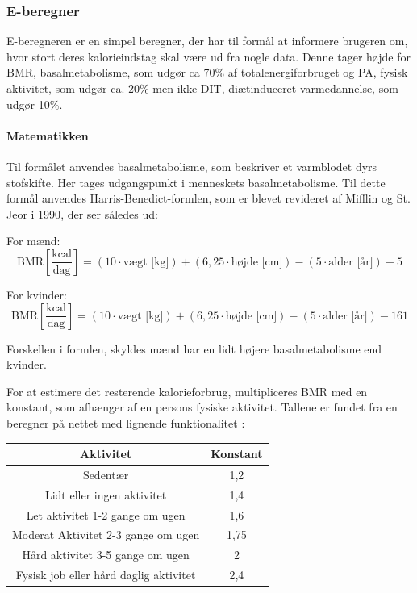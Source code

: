 \subsubsection{E-beregner}
E-beregneren er en simpel beregner, der har til formål at informere brugeren om, hvor stort deres kalorieindstag skal være ud fra nogle data. Denne tager højde for BMR, basalmetabolisme, som udgør ca 70\% af totalenergiforbruget og PA, fysisk aktivitet, som udgør ca. 20\% men ikke DIT, diætinduceret varmedannelse, som udgør 10\%\cite{EE-artikel}.

\paragraph{Matematikken}
Til formålet anvendes basalmetabolisme, som beskriver et varmblodet dyrs stofskifte.\cite{BMR-artikel} Her tages udgangspunkt i menneskets basalmetabolisme. Til dette formål anvendes Harris-Benedict-formlen, som er blevet revideret af Mifflin og St. Jeor i 1990\cite{Harris-Benedict-formel}, der ser således ud:

For mænd:
\begin{equation*}
    \text{BMR} \left[\dfrac{\text{kcal}}{\text{dag}}\right] = (10 \cdot \text{vægt [kg]}) + (6,25 \cdot \text{højde [cm]}) - (5 \cdot \text{alder [år]}) + 5
\end{equation*}

For kvinder:
\begin{equation*}
    \text{BMR} \left[\dfrac{\text{kcal}}{\text{dag}}\right] = (10 \cdot \text{vægt [kg]}) + (6,25 \cdot \text{højde [cm]}) - (5 \cdot \text{alder [år]}) - 161
\end{equation*}

Forskellen i formlen, skyldes mænd har en lidt højere basalmetabolisme end kvinder.

For at estimere det resterende kalorieforbrug, multipliceres BMR med en konstant, som afhænger af en persons fysiske aktivitet. Tallene er fundet fra en beregner på nettet med lignende funktionalitet \cite{OMNI-calc}:
\begin{table}[H]
    \centering
    \begin{tabular}{|c|c|}
        \hline
        \textbf{Aktivitet} & \textbf{Konstant} \\
        \hline
        Sedentær & 1,2 \\
        Lidt eller ingen aktivitet & 1,4 \\
        Let aktivitet 1-2 gange om ugen & 1,6 \\
        Moderat Aktivitet 2-3 gange om ugen & 1,75 \\
        Hård aktivitet 3-5 gange om ugen & 2 \\
        Fysisk job eller hård daglig aktivitet & 2,4 \\
        \hline
    \end{tabular}
\end{table}

